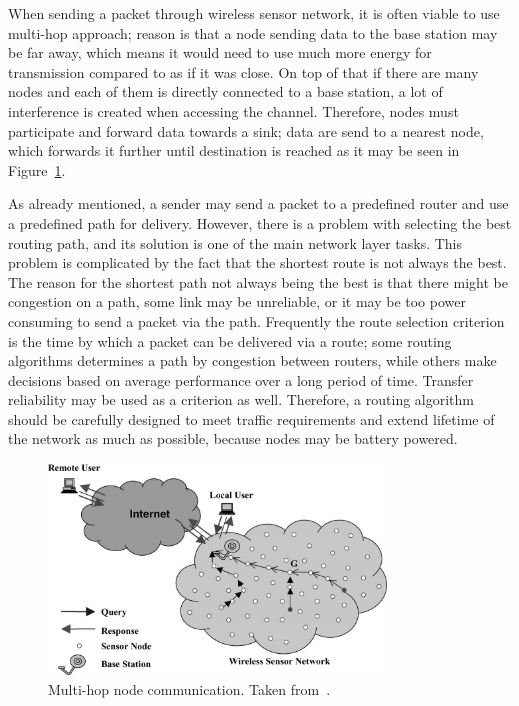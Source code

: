 When sending a packet through wireless sensor network, it is often viable to use multi-hop approach; reason is that a node sending data to the base station may be far away, which means it would need to use much more energy for transmission compared to as if it was close. On top of that if there are many nodes and each of them is directly connected to a base station, a lot of interference is created when accessing the channel. Therefore, nodes must participate and forward data towards a sink; data are send to a nearest node, which forwards it further until destination is reached as it may be seen in Figure~\ref{fig:multihop}.

As already mentioned, a sender may send a packet to a predefined router and use a predefined path for delivery. However, there is a problem with selecting the best routing path, and its solution is one of the main network layer tasks. This problem is complicated by the fact that the shortest route is not always the best. The reason for the shortest path not always being the best is that there might be congestion on a path, some link may be unreliable, or it may be too power consuming to send a packet via the path. Frequently the route selection criterion is the time by which a packet can be delivered via a route; some routing algorithms determines a path by congestion between routers, while others make decisions based on average performance over a long period of time. Transfer reliability may be used as a criterion as well. Therefore, a routing algorithm should be carefully designed to meet traffic requirements and extend lifetime of the network as much as possible, because nodes may be battery powered.

\begin{figure}
    \centering
    \includegraphics[width=0.8\textwidth]{00images/multihop}
    \caption{Multi-hop node communication. Taken from~\cite{Sohraby2007WirelessApplications}.}
    \label{fig:multihop}
\end{figure}

